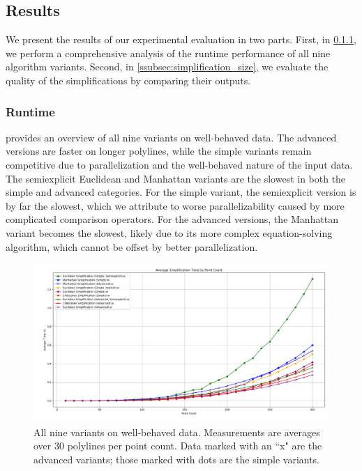 \subsection{Results}
\label{subsec:results}

We present the results of our experimental evaluation in two parts. First, in \cref{ssubsec:runtime}, we perform a comprehensive analysis of the runtime performance of all nine algorithm variants. Second, in \cref{ssubsec:simplification_size}, we evaluate the quality of the simplifications by comparing their outputs.

\subsubsection{Runtime}
\label{ssubsec:runtime}

 provides an overview of all nine variants on well-behaved data. The advanced versions are faster on longer polylines, while the simple variants remain competitive due to parallelization and the well-behaved nature of the input data. The semiexplicit Euclidean and Manhattan variants are the slowest in both the simple and advanced categories. For the simple variant, the semiexplicit version is by far the slowest, which we attribute to worse parallelizability caused by more complicated comparison operators. For the advanced versions, the Manhattan variant becomes the slowest, likely due to its more complex equation-solving algorithm, which cannot be offset by better parallelization.

\begin{figure}[b]
  \centering
	\includegraphics[scale=0.4]{figures/res_all300w.png}
  \caption{All nine variants on well-behaved data. Measurements are averages over 30 polylines per point count. Data marked with an ``x" are the advanced variants; those marked with dots are the simple variants.}
  \label{fig:res_all300w}
\end{figure}

